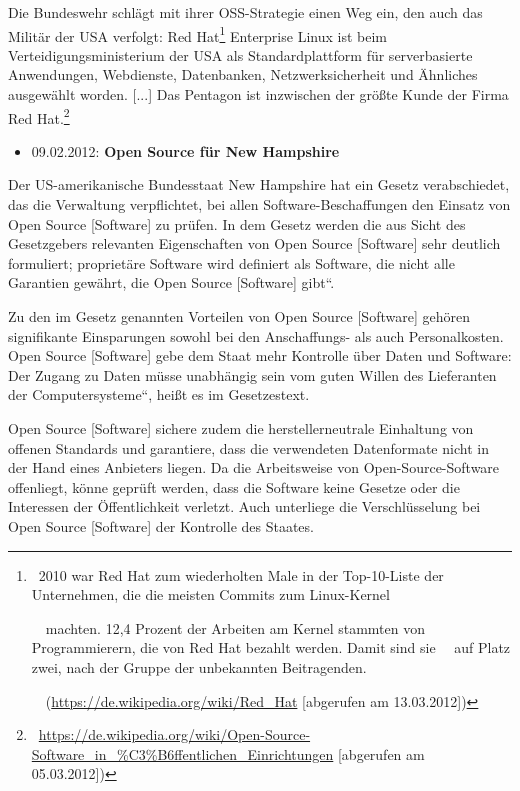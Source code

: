 \documentclass[a4paper]{article}
\newcommand\textstyleInternetlink[1]{\foreignlanguage{english}{\textcolor[rgb]{0.0,0.0,0.5019608}{#1}}}
\newcommand\liststyleWWviiiNumiii{%
\renewcommand\theenumi{\arabic{enumi}}
\renewcommand\theenumii{\arabic{enumii}}
\renewcommand\theenumiii{\arabic{enumiii}}
\renewcommand\labelitemi{{}-}
\renewcommand\labelenumi{\theenumi.}
\renewcommand\labelenumii{\theenumii.}
\renewcommand\labelenumiii{\theenumiii.}
}
\begin{document}
{
Die Bundeswehr schl\"agt mit ihrer OSS-Strategie einen Weg ein, den auch
das Milit\"ar der USA verfolgt: {\guillemotright}Red
Hat\footnote{\ {\guillemotright}2010 war Red Hat zum wiederholten Male
in der Top-10-Liste der Unternehmen, die die meisten Commits zum
Linux-Kernel\par \ \ machten. 12,4 Prozent der Arbeiten am Kernel
stammten von Programmierern, die von Red Hat bezahlt werden. Damit sind
sie \ \ auf Platz zwei, nach der Gruppe der unbekannten
Beitragenden.{\guillemotleft}\par
\ \ (\url{https://de.wikipedia.org/wiki/Red_Hat} [abgerufen am
13.03.2012])} Enterprise Linux ist beim Verteidigungsministerium der
USA als Standardplattform f\"ur serverbasierte Anwendungen, Webdienste,
Datenbanken, Netzwerksicherheit und \"Ahnliches ausgew\"ahlt worden.
[...] Das Pentagon ist inzwischen der gr\"o{\ss}te Kunde der Firma Red
Hat.{\guillemotleft}\footnote{\ \href{https://de.wikipedia.org/wiki/Open-Source-Software_in_?ffentlichen_Einrichtungen}{\textstyleInternetlink{https://de.wikipedia.org/wiki/Open-Source-Software\_in\_\%C3\%B6ffentlichen\_Einrichtungen}}
[abgerufen am 05.03.2012])}}


\bigskip

\liststyleWWviiiNumiii
\begin{itemize}
\item {
{\guillemotright}09.02.2012: \textbf{Open Source f\"ur New Hampshire}}
\end{itemize}
{
Der US-amerikanische Bundesstaat New Hampshire hat ein Gesetz
verabschiedet, das die Verwaltung verpflichtet, bei allen
Software-Beschaffungen den Einsatz von Open Source [Software] zu
pr\"ufen. In dem Gesetz werden die aus Sicht des Gesetzgebers
relevanten Eigenschaften von Open Source [Software] sehr deutlich
formuliert; propriet\"are Software wird definiert als
{\quotedblbase}Software, die nicht alle Garantien gew\"ahrt, die Open
Source [Software] gibt{\textquotedblleft}.}

{
Zu den im Gesetz genannten Vorteilen von Open Source [Software]
geh\"oren signifikante Einsparungen sowohl bei den Anschaffungs- als
auch Personalkosten. Open Source [Software] gebe dem Staat mehr
Kontrolle \"uber Daten und Software: Der Zugang zu Daten m\"usse
{\quotedblbase}unabh\"angig sein vom guten Willen des Lieferanten der
Computersysteme{\textquotedblleft}, hei{\ss}t es im Gesetzestext.}

{
Open Source [Software] sichere zudem die herstellerneutrale Einhaltung
von offenen Standards und garantiere, dass die verwendeten Datenformate
nicht in der Hand eines Anbieters liegen. Da die Arbeitsweise von
Open-Source-Software offenliegt, k\"onne gepr\"uft werden, dass die
Software keine Gesetze oder die Interessen der \"Offentlichkeit
verletzt. Auch unterliege die Verschl\"usselung bei Open Source
[Software] der Kontrolle des Staates.}
\end{document}
